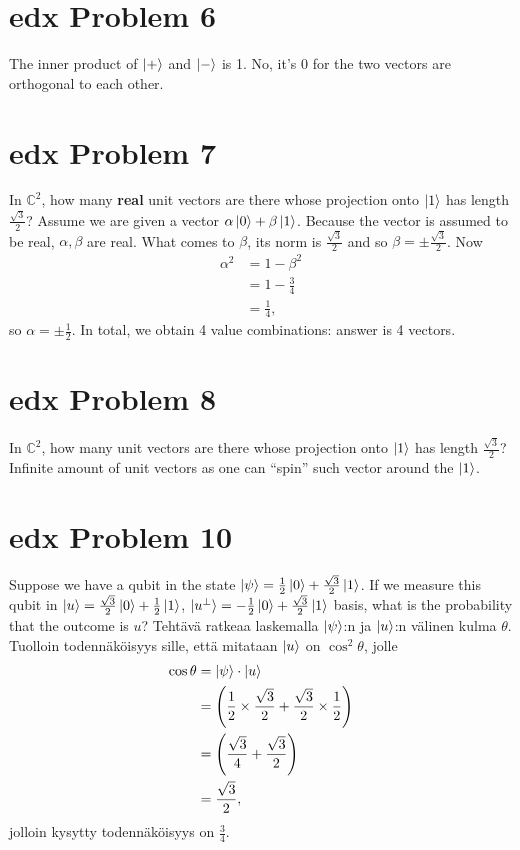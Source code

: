 \documentclass[10pt]{article}
\begin{document}
 \section*{edx Problem 6}
 \color{blue} The inner product of $\ket{+}$ and $\ket{-}$ is 1.
 \color{black} No, it's 0 for the two vectors are orthogonal to each other.
 
 \section*{edx Problem 7}
 \color{blue} In $\mathbb{C}^2$, how many \textbf{real} unit vectors are there whose projection onto $\ket{1}$ has length $\frac{\sqrt{3}}{2}$?
 \color{black} Assume we are given a vector $\alpha \ket{0} + \beta \ket{1}$. Because the vector is assumed to be real, $\alpha, \beta$ are real. What comes to $\beta$, its norm is $\frac{\sqrt{3}}{2}$ and so $\beta = \pm\frac{\sqrt{3}}{2}$. Now 
 \begin{align*}
 \alpha^2 &= 1 - \beta^2 \\
                &= 1 - \frac{3}{4} \\
                &= \frac{1}{4},
\end{align*}
so $\alpha = \pm \frac{1}{2}$. In total, we obtain 4 value combinations: answer is 4 vectors.

\section*{edx Problem 8}
\color{blue} In $\mathbb{C}^2$, how many unit vectors are there whose projection onto $\ket{1}$ has length $\frac{\sqrt{3}}{2}$?
\color{black} Infinite amount of unit vectors as one can ``spin'' such vector around the $\ket{1}$.

\section*{edx Problem 10}
\color{blue} Suppose we have a qubit in the state $\ket{\psi} = \frac{1}{2}\ket{0} + \frac{\sqrt{3}}{2}\ket{1}$. If we measure this qubit in $\ket{u} = \frac{\sqrt{3}}{2} \ket{0} + \frac{1}{2} \ket{1}$, $\ket{u^{\perp}} = - \frac{1}{2} \ket{0} + \frac{\sqrt{3}}{2} \ket{1}$ basis, what is the probability that the outcome is $u$?
\color{black} Tehtävä ratkeaa laskemalla $\ket{\psi}$:n ja $\ket{u}$:n välinen kulma $\theta$. Tuolloin todennäköisyys sille, että mitataan $\ket{u}$ on $\cos^2 \theta$, jolle
\begin{align*}
\cos \theta &= \ket{\psi} \cdot \ket{u} \\
                  &= \Bigg( \frac{1}{2} \times \frac{\sqrt{3}}{2} + \frac{\sqrt{3}}{2} \times \frac{1}{2} \Bigg) \\
                  &= \Bigg( \frac{\sqrt{3}}{4} + \frac{\sqrt{3}}{2} \Bigg) \\ 
                  &= \frac{\sqrt{3}}{2},
\end{align*}
jolloin kysytty todennäköisyys on $\frac{3}{4}$.
\end{document}
